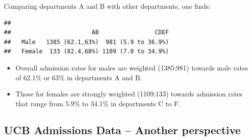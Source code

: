 \documentclass[
  10pt,
  b5paper]{book}
\providecommand{\tightlist}{%
  \setlength{\itemsep}{0pt}\setlength{\parskip}{0pt}}
\begin{document}

Comparing departments A and B with other departments, one finds:

\begin{verbatim}
##         
##                       AB                CDEF
##   Male   1385 (62.1,63%)  981 (5.9 to 36.9%)
##   Female  133 (82.4,68%) 1109 (7.0 to 34.9%)
\end{verbatim}

\begin{itemize}
\tightlist
\item
  Overall admission rates for males are weighted (1385:981) towards
  male rates of 62.1\% or 63\% in departments A and B.
\item
  Those for females are strongly weighted (1109:133) towards admission rates that range from 5.9\% to 34.1\% in departments C to F.
\end{itemize}

\hypertarget{ucb-admissions-data-another-perspective}{%
\subsection*{UCB Admissions Data -- Another perspective}\label{ucb-admissions-data-another-perspective}}
\end{document}
